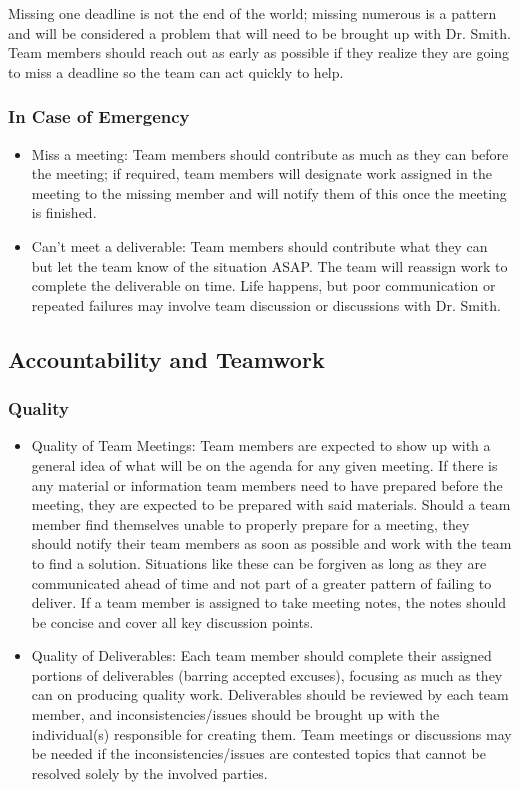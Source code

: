 \documentclass{article}
\begin{document}
Missing one deadline is not the end of the world; missing numerous is a pattern and will be considered a problem that will need to be brought up with Dr. Smith. Team members should reach out as early as possible if they realize they are going to miss a deadline so the team can act quickly to help. 
\subsubsection*{In Case of Emergency}

\begin{itemize}
  \item Miss a meeting: Team members should contribute as much as they can before the meeting; if required, team members will designate work assigned in the meeting to the missing member and will notify them of this once the meeting is finished. 
  \item Can't meet a deliverable: Team members should contribute what they can but let the team know of the situation ASAP. The team will reassign work to complete the deliverable on time. Life happens, but poor communication or repeated failures may involve team discussion or discussions with Dr. Smith. 
\end{itemize}

\subsection*{Accountability and Teamwork}

\subsubsection*{Quality} 
\begin{itemize}
  \item Quality of Team Meetings: Team members are expected to show up with a general idea of what will be on the agenda for any given meeting. If there is any material or information team members need to have prepared before the meeting, they are expected to be prepared with said materials. Should a team member find themselves unable to properly prepare for a meeting, they should notify their team members as soon as possible and work with the team to find a solution. Situations like these can be forgiven as long as they are communicated ahead of time and not part of a greater pattern of failing to deliver. If a team member is assigned to take meeting notes, the notes should be concise and cover all key discussion points. 
  \item Quality of Deliverables: Each team member should complete their assigned portions of deliverables (barring accepted excuses), focusing as much as they can on producing quality work. Deliverables should be reviewed by each team member, and inconsistencies/issues should be brought up with the individual(s) responsible for creating them. Team meetings or discussions may be needed if the inconsistencies/issues are contested topics that cannot be resolved solely by the involved parties.  
\end{itemize}
\end{document}
